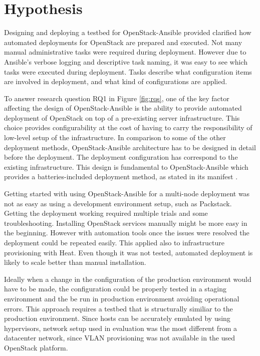 \section{Hypothesis}

Designing and deploying a testbed for OpenStack-Ansible provided clarified how
automated deployments for OpenStack are prepared and executed. Not many manual
administrative tasks were required during deployment. However due to Ansible's
verbose logging and descriptive task naming, it was easy to see which tasks
were executed during deployment. Tasks describe what configuration items are
involved in deployment, and what kind of configurations are applied.

To answer research question RQ1 in Figure \ref{fig:rqs}, one of the key factor
affecting the design of OpenStack-Ansible is the ability to provide automated
deployment of OpenStack on top of a pre-existing server infrastructure. This
choice provides configurability at the cost of having to carry the
responsibility of low-level setup of the infrastructure. In comparison to some
of the other deployment methods, OpenStack-Ansible architecture has to be
designed in detail before the deployment. The deployment configuration has
correspond to the existing infrastructure. This design is fundamental to
OpenStack-Ansible which provides a batteries-included deployment method, as
stated in its manifest \cite{openstack-ansible}.

Getting started with using OpenStack-Ansible for a multi-node deployment was
not as easy as using a development environment setup, such as Packstack.
Getting the deployment working required multiple trials and some
troubleshooting. Installing OpenStack services manually might be more easy in
the beginning. However with automation tools once the issues were resolved the
deployment could be repeated easily. This applied also to infrastructure
provisioning with Heat. Even though it was not tested, automated deployment is
likely to scale better than manual installation.

Ideally when a change in the configuration of the production environment would
have to be made, the configuration could be properly tested in a staging
environment and the be run in production environment avoiding operational
errors. This approach requires a testbed that is structurally similiar to the
production environment. Since hosts can be accurately emulated by using
hypervisors, network setup used in evaluation was the most different from a
datacenter network, since VLAN provisioning was not available in the used
OpenStack platform.

